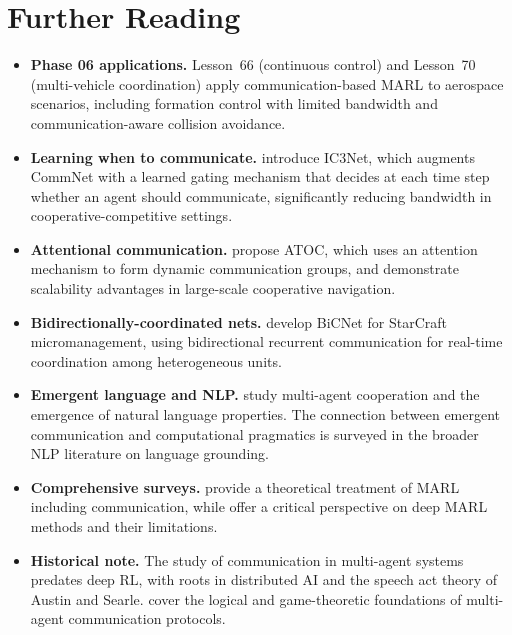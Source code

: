 \documentclass[11pt,a4paper]{article}
\begin{document}
\section{Further Reading}
\label{sec:further-reading}

\begin{itemize}
  \item \textbf{Phase 06 applications.}  Lesson~66 (continuous
    control) and Lesson~70 (multi-vehicle coordination) apply
    communication-based MARL to aerospace scenarios, including
    formation control with limited bandwidth and
    communication-aware collision avoidance.
  \item \textbf{Learning when to communicate.}
    \citet{singh2019} introduce IC3Net, which augments CommNet
    with a learned gating mechanism that decides at each time
    step whether an agent should communicate, significantly
    reducing bandwidth in cooperative-competitive settings.
  \item \textbf{Attentional communication.}  \citet{jiang2018}
    propose ATOC, which uses an attention mechanism to form
    dynamic communication groups, and demonstrate scalability
    advantages in large-scale cooperative navigation.
  \item \textbf{Bidirectionally-coordinated nets.}
    \citet{peng2017} develop BiCNet for StarCraft micromanagement,
    using bidirectional recurrent communication for real-time
    coordination among heterogeneous units.
  \item \textbf{Emergent language and NLP.}  \citet{lazaridou2017}
    study multi-agent cooperation and the emergence of natural
    language properties.  The connection between emergent
    communication and computational pragmatics is surveyed in
    the broader NLP literature on language grounding.
  \item \textbf{Comprehensive surveys.}  \citet{zhang2021}
    provide a theoretical treatment of MARL including
    communication, while \citet{hernandezleal2019} offer a
    critical perspective on deep MARL methods and their
    limitations.
  \item \textbf{Historical note.}  The study of communication in
    multi-agent systems predates deep RL, with roots in
    distributed AI and the speech act theory of Austin and Searle.
    \citet{shoham2008} cover the logical and game-theoretic
    foundations of multi-agent communication protocols.
\end{itemize}


\end{document}

